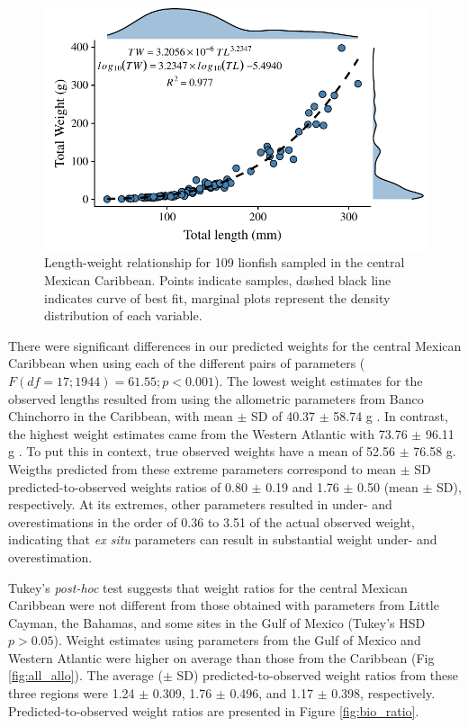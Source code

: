 \documentclass[fleqn,10pt,lineno]{wlpeerj} %
\begin{document}
\begin{figure}
\centering
\includegraphics{Manuscript_files/figure-latex/fit1-1.pdf}
\caption{\label{fig:l-w-carib}Length-weight relationship for 109
lionfish sampled in the central Mexican Caribbean. Points indicate
samples, dashed black line indicates curve of best fit, marginal plots
represent the density distribution of each variable.}
\end{figure}

There were significant differences in our predicted weights for the
central Mexican Caribbean when using each of the different pairs of
parameters (\(F(df = 17; 1944) = 61.55; p < 0.001\)). The lowest weight
estimates for the observed lengths resulted from using the allometric
parameters from Banco Chinchorro in the Caribbean, with mean \(\pm\) SD
of 40.37 \(\pm\) 58.74 g \citep{sabidoitz_2016}. In contrast, the
highest weight estimates came from the Western Atlantic with 73.76
\(\pm\) 96.11 g \citep{barbour_2011}. To put this in context, true
observed weights have a mean of 52.56 \(\pm\) 76.58 g. Weigths predicted
from these extreme parameters correspond to mean \(\pm\) SD
predicted-to-observed weights ratios of 0.80 \(\pm\) 0.19 and 1.76
\(\pm\) 0.50 (mean \(\pm\) SD), respectively. At its extremes, other
parameters resulted in under- and overestimations in the order of 0.36
to 3.51 of the actual observed weight, indicating that \emph{ex situ}
parameters can result in substantial weight under- and overestimation.

Tukey's \emph{post-hoc} test suggests that weight ratios for the central
Mexican Caribbean were not different from those obtained with parameters
from Little Cayman, the Bahamas, and some sites in the Gulf of Mexico
(Tukey's HSD \(p > 0.05\)). Weight estimates using parameters from the
Gulf of Mexico and Western Atlantic were higher on average than those
from the Caribbean (Fig \ref{fig:all_allo}). The average (\(\pm\) SD)
predicted-to-observed weight ratios from these three regions were 1.24
\(\pm\) 0.309, 1.76 \(\pm\) 0.496, and 1.17 \(\pm\) 0.398, respectively.
Predicted-to-observed weight ratios are presented in Figure
\ref{fig:bio_ratio}.
\end{document}
